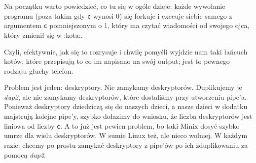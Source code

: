 Na początku warto powiedzieć, co tu się w ogóle dzieje: każde wywołanie programu (poza takim gdy \texttt{c} wynosi 0) się forkuje i execuje siebie samego z argumentem \texttt{c} pomniejszonym o 1, który ma czytać wiadomości od swojego ojca, który zmienił się w :kota:.

Czyli, efektywnie, jak się to rozrysuje i chwilę pomyśli wyjdzie nam taki łańcuch kotów, które przepisują to co im napisano na swój output; jest to pewnego rodzaju głuchy telefon.

Problem jest jeden: deskryptory. Nie zamykamy deskryptorów. Duplikujemy je \textit{dup2}, ale nie zamykamy deskryptorów, które dostaliśmy przy utworzeniu pipe'a. Ponieważ deskryptory dziedziczą się do naszych dzieci, a nasze dzieci w dodatku majstrują kolejne pipe'y, szybko dołazimy do wniosku, że liczba deskryptorów jest liniowa od liczby \texttt{c}. A to już jest pewien problem, bo taki Minix dosyć szybko umrze dla wielu deskryptorów. W sumie Linux też, ale nieco wolniej. W każdym razie: chcemy po prostu zamykać deskryptory z pipe'ów po ich zduplikowaniu za pomocą \textit{dup2}.